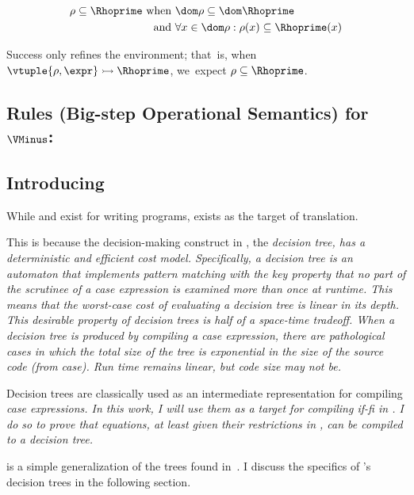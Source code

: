 \documentclass[manuscript,screen,review, 12pt, nonacm]{acmart}
\begin{document}
    \begin{align*}
    \rho \subseteq \Rhoprime \text{ when }&\dom\rho  \subseteq \dom \Rhoprime\\
    \text{ and } &\forall x \in \dom \rho: \rho(x) \subseteq \Rhoprime(x)
    \end{align*}
    
    \medskip
        
    Success only refines the environment; that~is, when ${\vtuple{\rho, \expr}}
    \rightarrowtail{} {\Rhoprime}$, we~expect $\rho \subseteq \Rhoprime$.
    
    \vfilbreak
    
    \subsection{Rules (Big-step Operational Semantics) for $\VMinus$:}
    \label{vmsemantics}
    \vmsemantics

\subsection{Introducing \D}
\label{d}

While \PPlus and \VMinus exist for writing programs, \D exists as the target
of translation. 

This is because the decision-making construct in \D, the \it{decision tree}, has
a deterministic and efficient cost model. Specifically, a decision tree is an
automaton that implements pattern matching with the key property that no part of
the scrutinee of a \it{case} expression is examined more than once at runtime.
This means that the worst-case cost of evaluating a decision tree is linear in
its depth. This desirable property of decision trees is half of a space-time
tradeoff. When a decision tree is produced by compiling a \it{case} expression,
there are pathological cases in which the total size of the tree is exponential
in the size of the source code (from \it{case}). Run time remains linear, but
code size may not be. 

Decision trees are classically used as an intermediate representation for
compiling \it{case} expressions. In this work, I will use them as a target for
compiling \it{if-fi} in \VMinus. I do so to prove that equations, at least given
their restrictions in \VMinus, can be compiled to a decision tree. 

\D is a simple generalization of the trees found in~\citet{maranget}. I discuss
the specifics of \D's decision trees in the following section. 
\end{document}

